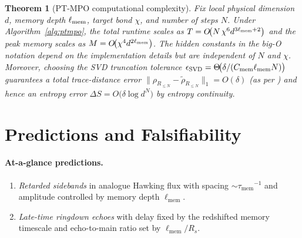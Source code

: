 \documentclass[a4paper,11pt]{article}
\newcommand{\ellmem}{\ensuremath{\ell_{\mathrm{mem}}}}
\newcommand{\taumem}{\ensuremath{\tau_{\mathrm{mem}}}}
\theoremstyle{plain}
\newtheorem{theorem}{Theorem}
\theoremstyle{definition}
\theoremstyle{remark}
\begin{document}
\begin{theorem}[PT-MPO computational complexity]\label{thm:ptmpo-complexity}
Fix local physical dimension $d$, memory depth $\ell_{\rm mem}$, target bond $\chi$, and number of steps $N$. Under Algorithm~\ref{alg:ptmpo}, the total runtime scales as $T=O\!\big(N\,\chi^6 d^{3\ell_{\rm mem}+2}\big)$ and the peak memory scales as $M=O\!\big(\chi^4 d^{2\ell_{\rm mem}}\big)$. The hidden constants in the big-O notation depend on the implementation details but are independent of $N$ and $\chi$. Moreover, choosing the SVD truncation tolerance $\epsilon_{\rm SVD}=\Theta\!\big(\delta/(C_{\rm mem}\ell_{\rm mem} N)\big)$ guarantees a total trace-distance error $\|\rho_{R_{\le N}}-\tilde\rho_{R_{\le N}}\|_1=O(\delta)$ (as per ) and hence an entropy error $\Delta S=O\!\big(\delta\log d^N\big)$ by entropy continuity. 
\end{theorem}

\section{Predictions and Falsifiability}
\label{sec:predictions}
\label{sec:phenomenology}

\paragraph{At-a-glance predictions.}
\begin{enumerate}
  \item \emph{Retarded sidebands} in analogue Hawking flux with spacing \(\sim \taumem^{-1}\) and amplitude controlled by memory depth \(\ellmem\).
  \item \emph{Late-time ringdown echoes} with delay fixed by the redshifted memory timescale and echo-to-main ratio set by \(\ellmem/R_s\).
\end{enumerate}
\end{document}
